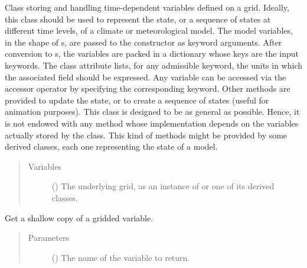 \documentclass[letterpaper,10pt,english]{sphinxmanual}
\begin{document}
\begin{fulllineitems}
\label{\detokenize{api:storages.grid_data.GridData}}
Class storing and handling time-dependent variables defined on a grid. Ideally, this class should be used to
represent the state, or a sequence of states at different time levels, of a  climate or meteorological model.
The model variables, in the shape of s, are passed to the constructor as keyword arguments.
After conversion to s, the variables are packed in a dictionary whose keys are the input keywords.
The class attribute  lists, for any admissible keyword, the units in which the associated field should
be expressed. Any variable can be accessed via the accessor operator by specifying the corresponding
keyword. Other methods are provided to update the state, or to create a sequence of states (useful for animation purposes).
This class is designed to be as general as possible. Hence, it is not endowed with any method whose
implementation depends on the variables actually stored by the class. This kind of methods might be provided by some
derived classes, each one representing the state of a  model.
\begin{quote}\begin{description}
\item[{Variables}] \leavevmode
{} () \textendash{} The underlying grid, as an instance of {\hyperref[\detokenize{api:grids.grid_xyz.GridXYZ}]{}} or one of its derived classes.

\end{description}\end{quote}

\begin{fulllineitems}
\label{\detokenize{api:storages.grid_data.GridData.__getitem__}}
Get a shallow copy of a gridded variable.
\begin{quote}\begin{description}
\item[{Parameters}] \leavevmode
{} () \textendash{} The name of the variable to return.


\end{description}
\end{quote}
\end{fulllineitems}
\end{fulllineitems}
\end{document}
